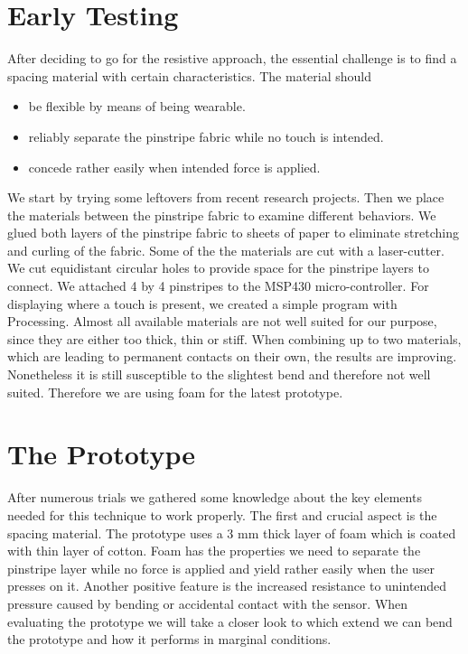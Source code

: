 \section{Early Testing}
After deciding to go for the resistive approach, the essential challenge is to find a spacing material with certain characteristics. The material should
\begin{itemize}
\item be flexible by means of being wearable.
\item reliably separate the pinstripe fabric while no touch is intended.
\item concede rather easily when intended force is applied.
\end{itemize}
We start by trying some leftovers from recent research projects. 
Then we place the materials between the pinstripe fabric to examine different behaviors. We glued both layers of the pinstripe fabric to sheets of paper to eliminate stretching and curling of the fabric. Some of the the materials are cut with a laser-cutter. We cut equidistant circular holes to provide space for the pinstripe layers to connect. We attached 4 by 4 pinstripes to the MSP430 micro-controller. For displaying where a touch is present, we created a simple program with Processing.
Almost all available materials are not well suited for our purpose, since they are either too thick, thin or stiff. When combining up to two materials, which are leading to permanent contacts on their own, the results are improving. Nonetheless it is still susceptible to the slightest bend and therefore not well suited. Therefore we are using foam for the latest prototype. 

\section{The Prototype}

After numerous trials we gathered some knowledge about the key elements needed for this technique to work properly. The first and crucial aspect is the spacing material. The prototype uses a 3 mm thick layer of foam which is coated with thin layer of cotton. Foam has the properties we need to separate the pinstripe layer while no force is applied and yield rather easily when the user presses on it. Another positive feature is the increased resistance to unintended pressure caused by bending or accidental contact with the sensor. When evaluating the prototype we will take a closer look to which extend we can bend the prototype and how it performs in marginal conditions.
\\ \\


